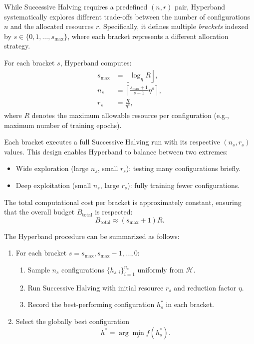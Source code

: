While Successive Halving requires a predefined $(n, r)$ pair, Hyperband systematically explores different trade-offs between the number of configurations $n$ and the allocated resources $r$. Specifically, it defines multiple \textit{brackets} indexed by $s \in \{0, 1, \ldots, s_{\max}\}$, where each bracket represents a different allocation strategy.

For each bracket $s$, Hyperband computes:
\begin{align}
	s_{\max} & = \left\lfloor \log_{\eta} R \right\rfloor,                   \\
	n_s      & = \left\lceil \frac{s_{\max} + 1}{s + 1} \eta^s \right\rceil, \\
	r_s      & = \frac{R}{\eta^s},
	\label{eq:hyperband_parameters}
\end{align}
where $R$ denotes the maximum allowable resource per configuration (e.g., maximum number of training epochs).

Each bracket executes a full Successive Halving run with its respective $(n_s, r_s)$ values. This design enables Hyperband to balance between two extremes:
\begin{itemize}
	\item Wide exploration (large $n_s$, small $r_s$): testing many configurations briefly.
	\item Deep exploitation (small $n_s$, large $r_s$): fully training fewer configurations.
\end{itemize}

The total computational cost per bracket is approximately constant, ensuring that the overall budget $B_{\text{total}}$ is respected:
\begin{equation}
	B_{\text{total}} \approx (s_{\max} + 1) R.
\end{equation}

The Hyperband procedure can be summarized as follows:
\begin{enumerate}
	\item For each bracket $s = s_{\max}, s_{\max}-1, \ldots, 0$:
	      \begin{enumerate}
		      \item Sample $n_s$ configurations $\{h_{s,i}\}_{i=1}^{n_s}$ uniformly from $\mathcal{H}$.
		      \item Run Successive Halving with initial resource $r_s$ and reduction factor $\eta$.
		      \item Record the best-performing configuration $h_s^*$ in each bracket.
	      \end{enumerate}
	\item Select the globally best configuration
	      \begin{equation}
		      h^* = \arg\min_{s} f(h_s^*).
	      \end{equation}
\end{enumerate}

